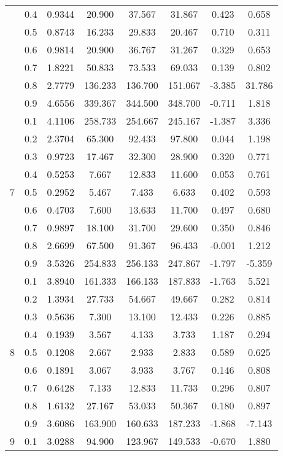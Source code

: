 \documentclass[11pt,a4paper]{report}
\begin{document}
\begin{longtable}{ | c | c || c | c | c | c | c | c | }
 & 0.4 & 0.9344 & 20.900 & 37.567 & 31.867 & 0.423 & 0.658 \\
 & 0.5 & 0.8743 & 16.233 & 29.833 & 20.467 & 0.710 & 0.311 \\
 & 0.6 & 0.9814 & 20.900 & 36.767 & 31.267 & 0.329 & 0.653 \\
 & 0.7 & 1.8221 & 50.833 & 73.533 & 69.033 & 0.139 & 0.802 \\
 & 0.8 & 2.7779 & 136.233 & 136.700 & 151.067 & -3.385 & 31.786 \\
 & 0.9 & 4.6556 & 339.367 & 344.500 & 348.700 & -0.711 & 1.818 \\
 \hline
\multirow{9}{*}{7} & 0.1 & 4.1106 & 258.733 & 254.667 & 245.167 & -1.387 & 3.336 \\
 & 0.2 & 2.3704 & 65.300 & 92.433 & 97.800 & 0.044 & 1.198 \\
 & 0.3 & 0.9723 & 17.467 & 32.300 & 28.900 & 0.320 & 0.771 \\
 & 0.4 & 0.5253 & 7.667 & 12.833 & 11.600 & 0.053 & 0.761 \\
 & 0.5 & 0.2952 & 5.467 & 7.433 & 6.633 & 0.402 & 0.593 \\
 & 0.6 & 0.4703 & 7.600 & 13.633 & 11.700 & 0.497 & 0.680 \\
 & 0.7 & 0.9897 & 18.100 & 31.700 & 29.600 & 0.350 & 0.846 \\
 & 0.8 & 2.6699 & 67.500 & 91.367 & 96.433 & -0.001 & 1.212 \\
 & 0.9 & 3.5326 & 254.833 & 256.133 & 247.867 & -1.797 & -5.359 \\
 \hline
\multirow{9}{*}{8} & 0.1 & 3.8940 & 161.333 & 166.133 & 187.833 & -1.763 & 5.521 \\
 & 0.2 & 1.3934 & 27.733 & 54.667 & 49.667 & 0.282 & 0.814 \\
 & 0.3 & 0.5636 & 7.300 & 13.100 & 12.433 & 0.226 & 0.885 \\
 & 0.4 & 0.1939 & 3.567 & 4.133 & 3.733 & 1.187 & 0.294 \\
 & 0.5 & 0.1208 & 2.667 & 2.933 & 2.833 & 0.589 & 0.625 \\
 & 0.6 & 0.1891 & 3.067 & 3.933 & 3.767 & 0.146 & 0.808 \\
 & 0.7 & 0.6428 & 7.133 & 12.833 & 11.733 & 0.296 & 0.807 \\
 & 0.8 & 1.6132 & 27.167 & 53.033 & 50.367 & 0.180 & 0.897 \\
 & 0.9 & 3.6086 & 163.900 & 160.633 & 187.233 & -1.868 & -7.143 \\
 \hline
\multirow{9}{*}{9} & 0.1 & 3.0288 & 94.900 & 123.967 & 149.533 & -0.670 & 1.880 \\

\end{longtable}
\end{document}
